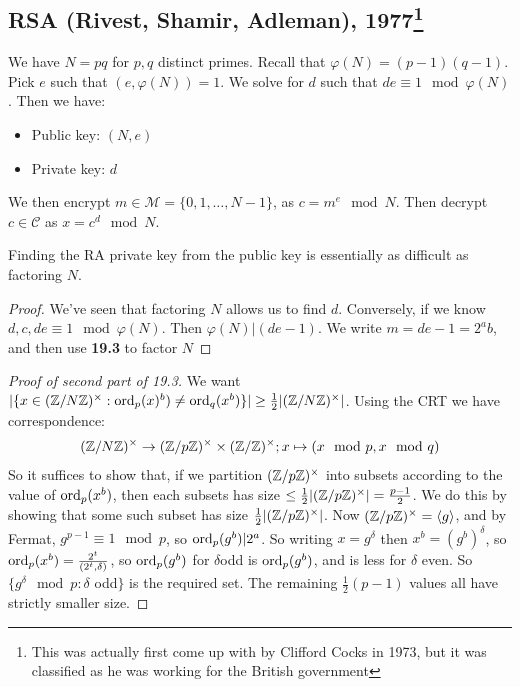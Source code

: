 \documentclass[10pt,a4paper]{article}
\begin{document}
\subsection{RSA (Rivest, Shamir, Adleman), 1977\footnote{This was actually first come up with by Clifford Cocks in 1973, but it was classified as he was working for the British government}}
We have $N = pq$ for $p,q$ distinct primes. Recall that $\varphi(N) = (p-1)(q-1)$. Pick $e$ such that $(e, \varphi(N)) = 1$. We solve for $d$ such that $de \equiv 1 \mod \varphi(N)$. Then we have:
\begin{itemize}
\item Public key: $(N,e)$
\item Private key: $d$
\end{itemize}
We then encrypt $m \in \mathcal{M} = \{0,1,\ldots, N-1\}$, as $c = m^e\mod N$. Then decrypt $c \in \mathcal{C}$ as $x = c^d  \mod N$.
\begin{corollary}
Finding the RA private key from the public key is essentially as difficult as factoring $N$.
\end{corollary}
\begin{proof}
We've seen that factoring $N$ allows us to find $d$. Conversely, if we know $d,c,de\equiv 1 \mod \varphi(N)$. Then $\varphi(N)|(de-1)$. We write $m=de-1=2^ab$, and then use \textbf{19.3} to factor $N$
\end{proof}
\begin{proof}[Proof of second part of 19.3]
We want $|\{x\in (\mathbb{Z}/N\mathbb{Z})^\times : \operatorname{ord}_p(x)^b) \neq \operatorname{ord}_q(x^b)\}|\geq \frac12|(\mathbb{Z}/N\mathbb{Z})^\times|$. Using the CRT we have correspondence:
\begin{align*}
(\mathbb{Z}/N\mathbb{Z})^\times \to (\mathbb{Z}/p\mathbb{Z})^\times \times (\mathbb{Z}/\mathbb{Z})^\times; x \mapsto (x\mod p, x \mod q)
\end{align*}
So it suffices to show that, if we partition $(\mathbb{Z}/p\mathbb{Z})^\times$ into subsets according to the value of $\operatorname{ord}_p(x^b)$, then each subsets has size $\leq \frac12 |(\mathbb{Z}/p\mathbb{Z})^\times| = \frac{p-1}{2}$. We do this by showing that some such subset has size $\frac12|(\mathbb{Z}/p\mathbb{Z})^\times|$. Now $(\mathbb{Z}/p\mathbb{Z})^\times = \langle g \rangle$, and by Fermat, $g^{p-1}\equiv 1 \mod p$, so $\operatorname{ord}_p(g^b)|2^a$. So writing $x = g^\delta$ then $x^b = (g^b)^\delta$, so $\operatorname{ord}_p(x^b) = \frac{2^t}{(2^t, \delta)}$, so $\operatorname{ord}_p(g^b)$ for $\delta$odd is $\operatorname{ord}_p(g^b)$, and is less for $\delta$ even. So $\{g^\delta \mod p: \delta $ odd$\}$ is the required set. The remaining $\frac12(p-1)$ values all have strictly smaller size.
\end{proof}
\end{document}
